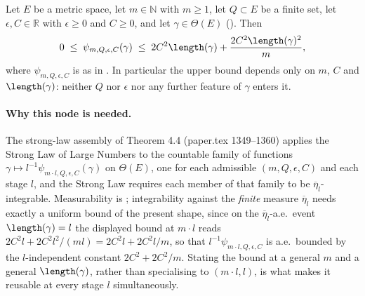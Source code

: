 \begin{lemma}
  Let $E$ be a metric space, let $m \in \mathbb{N}$ with $m \ge 1$, let $Q \subset E$ be a finite
  set, let $\epsilon, C \in \mathbb{R}$ with $\epsilon \ge 0$ and $C \ge 0$, and let
  $\gamma \in \Theta(E)$ (). Then
  \[
    0 \;\le\; \psi_{m,Q,\epsilon,C}(\gamma)
      \;\le\; 2C^2\length(\gamma) + \frac{2C^2\length(\gamma)^2}{m}
    ,
  \]
  where $\psi_{m,Q,\epsilon,C}$ is as in . In particular the upper bound depends only
  on $m$, $C$ and $\length(\gamma)$: neither $Q$ nor $\epsilon$ nor any further feature of $\gamma$
  enters it.

  \paragraph{Why this node is needed.} The strong-law assembly of Theorem 4.4 (paper.tex
  1349--1360) applies the Strong Law of Large Numbers to the countable family of functions
  $\gamma \mapsto l^{-1}\psi_{m\cdot l,Q,\epsilon,C}(\gamma)$ on $\Theta(E)$, one for each
  admissible $(m,Q,\epsilon,C)$ and each stage $l$, and the Strong Law requires each member of that
  family to be $\overline\eta_l$-integrable. Measurability is ; integrability
  against the \emph{finite} measure $\overline\eta_l$ needs exactly a uniform bound of the present
  shape, since on the $\overline\eta_l$-a.e.\ event $\length(\gamma)=l$ the displayed bound at
  $m\cdot l$ reads $2C^2l + 2C^2l^2/(m l) = 2C^2 l + 2C^2 l/m$, so that
  $l^{-1}\psi_{m\cdot l,Q,\epsilon,C}$ is a.e.\ bounded by the $l$-independent constant
  $2C^2 + 2C^2/m$. Stating the bound at a general $m$ and a general $\length(\gamma)$, rather than
  specialising to $(m\cdot l, l)$, is what makes it reusable at every stage $l$ simultaneously.
\end{lemma}
